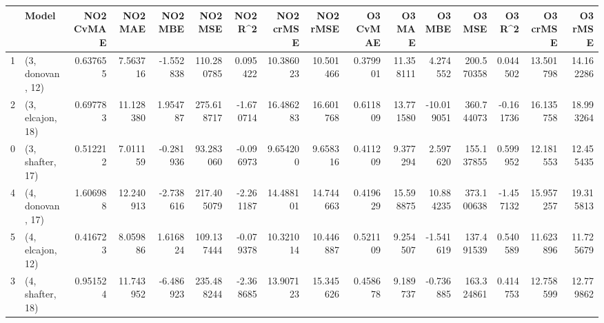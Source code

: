 \begin{tabular}{llrrrrrrrrrrrrrr}
\toprule
{} &             Model &  NO2 CvMAE &    NO2 MAE &   NO2 MBE &     NO2 MSE &   NO2 R\textasciicircum2 &  NO2 crMSE &   NO2 rMSE &  O3 CvMAE &     O3 MAE &     O3 MBE &      O3 MSE &    O3 R\textasciicircum2 &   O3 crMSE &    O3 rMSE \\
\midrule
1 &  (3, donovan, 12) &   0.637655 &   7.563716 & -1.552838 &  110.280785 &  0.095422 &  10.386023 &  10.501466 &  0.379901 &  11.358111 &   4.274552 &  200.570358 &  0.044502 &  13.501798 &  14.162286 \\
2 &  (3, elcajon, 18) &   0.697783 &  11.128380 &  1.954787 &  275.618717 & -1.670714 &  16.486283 &  16.601768 &  0.611809 &  13.771580 & -10.019051 &  360.744073 & -0.161736 &  16.135758 &  18.993264 \\
0 &  (3, shafter, 17) &   0.512212 &   7.011159 & -0.281936 &   93.283060 & -0.096973 &   9.654200 &   9.658316 &  0.411209 &   9.377294 &   2.597620 &  155.137855 &  0.599952 &  12.181553 &  12.455435 \\
4 &  (4, donovan, 17) &   1.606988 &  12.240913 & -2.738616 &  217.405079 & -2.261187 &  14.488101 &  14.744663 &  0.419629 &  15.598875 &  10.884235 &  373.100638 & -1.457132 &  15.957257 &  19.315813 \\
5 &  (4, elcajon, 12) &   0.416723 &   8.059886 &  1.616824 &  109.137444 & -0.079378 &  10.321014 &  10.446887 &  0.521109 &   9.254507 &  -1.541619 &  137.491539 &  0.540589 &  11.623896 &  11.725679 \\
3 &  (4, shafter, 18) &   0.951524 &  11.743952 & -6.486923 &  235.488244 & -2.368685 &  13.907123 &  15.345626 &  0.458678 &   9.189737 &  -0.736885 &  163.324861 &  0.414753 &  12.758599 &  12.779862 \\
\bottomrule
\end{tabular}
